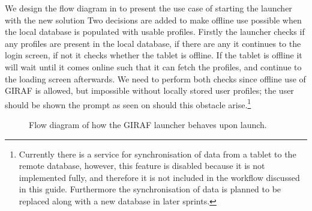 We design the flow diagram in  to present the use case of starting the launcher with the new solution
Two decisions are added to make offline use possible when the local database is populated with usable profiles.
Firstly the launcher checks if any profiles are present in the local database, if there are any it continues to the login screen, if not it checks whether the tablet is offline. 
If the tablet is offline it will wait until it comes online such that it can fetch the profiles, and continue to the loading screen afterwards.
We need to perform both checks since offline use of GIRAF is allowed, but impossible without locally stored user profiles; the user should be shown the prompt as seen on  should this obstacle arise.\footnote{Currently there is a service for synchronisation of data from a tablet to the remote database, however, this feature is disabled because it is not implemented fully, and therefore it is not included in the workflow discussed in this guide. Furthermore the synchronisation of data is planned to be replaced along with a new database in later sprints.}

\begin{figure}[h]
    \centering
    
    \caption{Flow diagram of how the GIRAF launcher behaves upon launch.}\label{fig:launcher_offline_flow}
\end{figure}

